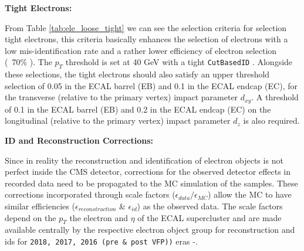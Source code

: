 \textbf{Tight Electrons:}

From Table \ref{tab:ele_loose_tight} we can see the selection criteria for selection tight electrons, this criteria basically enhances the selection of electrons with a low mis-identification rate and a rather lower efficiency of electron selection (~70\% \cite{cutbasedid}). The $p_{T}$ threshold is set at 40 GeV with a tight \verb|CutBasedID| \cite{cutbasedid}. Alongside these selections, the tight electrons should also satisfy an upper threshold selection of 0.05 in the ECAL barrel (EB) and 0.1 in the ECAL endcap (EC), for the transverse (relative to the primary vertex)  impact parameter $d_{xy}$. A threshold of 0.1 in the ECAL barrel (EB) and 0.2 in the ECAL endcap (EC) on the longitudinal (relative to the primary vertex) impact parameter $d_{z}$ is also required.

\textbf{ID and Reconstruction Corrections:}

Since in reality the reconstruction and identification of electron objects \cite{elereco} is not perfect inside the CMS detector, corrections for the observed detector effects in recorded data need to be propagated to the MC simulation of the samples. These corrections incorporated through scale factors ($\epsilon_{data} / \epsilon_{MC}$) allow the MC to have similar efficiencies ($\epsilon_{reconstruction}$ \& $\epsilon_{id}$) as the observed data. The scale factors depend on the $p_{T}$ the electron and $\eta$ of the ECAL supercluster and are made available centrally by the respective electron object group for reconstruction and ids for \verb|2018, 2017, 2016 (pre & post VFP))| eras \cite{elerecoid2018}-\cite{elerecoid2016postvfp}. 
\begin{table}
\centering
\caption{Loose and Tight electron selection criteria used}
\vspace{3mm}
\label{tab:ele_loose_tight}
\end{table}




